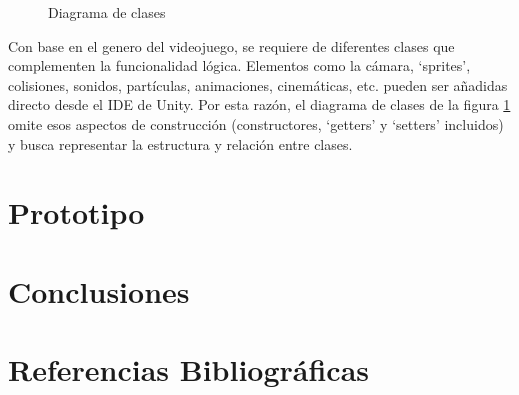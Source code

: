 \documentclass[12pt,twoside]{article}
\begin{document}
	\begin{figure}[H]
		\centering
		\caption{Diagrama de clases}
		\label{diagrama: clases}
	\end{figure}

	Con base en el genero del videojuego, se requiere de diferentes clases que complementen la funcionalidad lógica. Elementos como la cámara, `sprites', colisiones, sonidos, partículas, animaciones, cinemáticas, etc. pueden ser añadidas directo desde el IDE de Unity. Por esta razón, el diagrama de clases de la figura \ref{diagrama: clases} omite esos aspectos de construcción (constructores, `getters' y `setters' incluidos) y busca representar la estructura y relación entre clases.

	\clearpage
	
	\section{Prototipo}

	\clearpage
	
	\section{Conclusiones}
	
	\clearpage
	
	\section{Referencias Bibliográficas}
	
\end{document}

